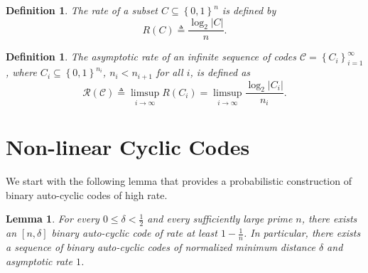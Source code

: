 \documentclass[twocolumn,twoside]{IEEEtran}
\theoremstyle{plain}
\newtheorem{lem}[thm]{Lemma$\!$}
\newenvironment{lemma}{\begin{lem}\hspace*{-1ex}{\bf.}}{\end{lem}}
\newtheorem{defn}[thm]{Definition$\!$}
\newenvironment{definition}{\begin{defn}\hspace*{-1ex}{\bf.}}{\end{defn}}
\newcommand{\cC}{\mathcal{C}}
\newcommand{\cR}{\mathcal{R}}
\newcommand{\mathset}[1]{\left\{#1\right\}}
\newcommand{\abs}[1]{\left|#1\right|}
\renewcommand{\leq}{\leqslant}
\newcommand{\eqdef}{\triangleq}
\begin{document}
\begin{definition}
The rate of a subset $C \subseteq \mathset{0,1}^n$ is defined by
\[
R(C)\eqdef\frac{\log_2{\abs{C}}}{n}.
\]
\end{definition}

\begin{definition}
The asymptotic rate of an infinite sequence of codes
$\cC=\mathset{C_i}_{i=1}^{\infty}$, where $C_i \subseteq
\mathset{0,1}^{n_i}$, $n_i<n_{i+1}$ for all $i$, is defined as
\[
\cR(\cC)\eqdef\limsup_{i \to \infty}R(C_i)=\limsup_{i \rightarrow \infty}\frac{\log_2{\abs{C_i}}}{n_i}.
\]
\end{definition}


\section{Non-linear Cyclic Codes}
\label{sec:GV}

We start with the following lemma that provides a probabilistic
construction of binary auto-cyclic codes of high rate.

\begin{lemma}
\label{lemma:auto}
For every $0 \leq \delta < \frac{1}{2}$ and every sufficiently large
prime $n$, there exists an $[n,\delta]$ binary auto-cyclic code of rate
at least $1-\frac{1}{n}$.
In particular, there exists a sequence
of binary auto-cyclic codes of normalized minimum distance $\delta$
and asymptotic rate $1$.
\end{lemma}
\end{document}
